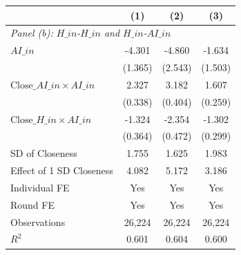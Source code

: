 \begin{table}[H]
\begin{threeparttable}
\begin{tabular}{l*{3}{c}}
\midrule
& (1) & (2) & (3) \\
\midrule
\multicolumn{4}{l}{\textit{Panel (b): $H\_{in}$-$H\_{in}$ and $H\_{in}$-$AI\_{in}$}} \\
\midrule
$AI\_{in}$   &      -4.301\sym{***}&      -4.860\sym{*}  &      -1.634         \\
            &     (1.365)         &     (2.543)         &     (1.503)         \\
\addlinespace
$\text{Close}\_{AI\_{in}} \times AI\_{in}$&       2.327\sym{***}&       3.182\sym{***}&       1.607\sym{***}\\
            &     (0.338)         &     (0.404)         &     (0.259)         \\
\addlinespace
$\text{Close}\_{H\_{in}} \times AI\_{in}$&      -1.324\sym{***}&      -2.354\sym{***}&      -1.302\sym{***}\\
            &     (0.364)         &     (0.472)         &     (0.299)         \\
\midrule
SD of Closeness&       1.755         &       1.625         &       1.983         \\
Effect of 1 SD Closeness&       4.082         &       5.172         &       3.186         \\
Individual FE&         Yes         &         Yes         &         Yes         \\
Round FE    &         Yes         &         Yes         &         Yes         \\
Observations&      26,224         &      26,224         &      26,224         \\
\(R^2\)     &       0.601         &       0.604         &       0.600         \\


\end{tabular}
\end{threeparttable}
\end{table}
